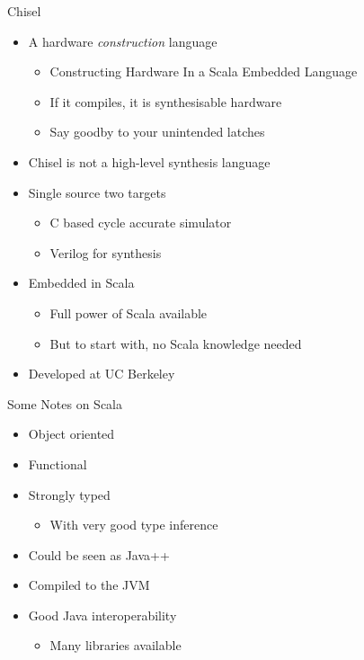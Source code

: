 \documentclass[xcolor=pdflatex,dvipsnames,table]{beamer}
\begin{document}
\begin{frame}[fragile]{Chisel}
\begin{itemize}
\item A hardware \emph{construction} language
\begin{itemize}
\item Constructing Hardware In a Scala Embedded Language
\item If it compiles, it is synthesisable hardware 
\item Say goodby to your unintended latches
\end{itemize}
\item Chisel is not a high-level synthesis language
\item Single source two targets
\begin{itemize}
\item C based cycle accurate simulator
\item Verilog for synthesis
\end{itemize}
\item Embedded in Scala
\begin{itemize}
\item Full power of Scala available
\item But to start with, no Scala knowledge needed
\end{itemize}
\item Developed at UC Berkeley
\end{itemize}
\end{frame}

\begin{frame}[fragile]{Some Notes on Scala}
\begin{itemize}
\item Object oriented
\item Functional
\item Strongly typed
\begin{itemize}
\item With very good type inference
\end{itemize}
\item Could be seen as Java++
\item Compiled to the JVM
\item Good Java interoperability
\begin{itemize}
\item Many libraries available
\end{itemize}
\end{itemize}
\end{frame}
\end{document}
